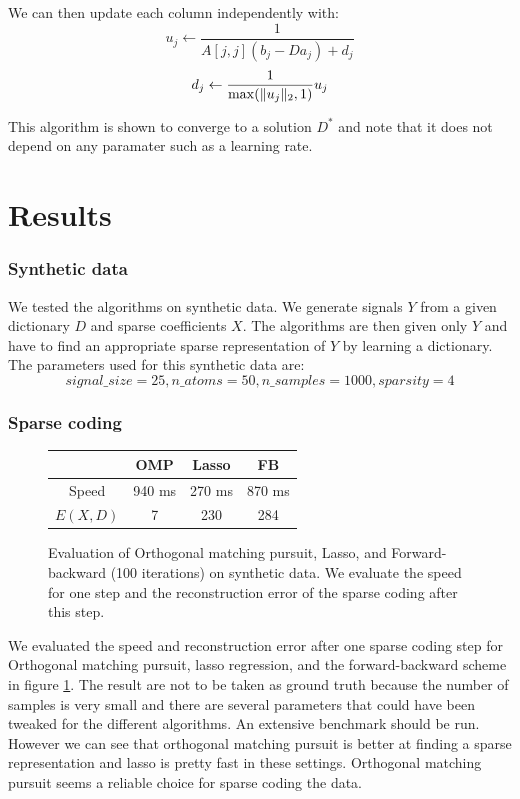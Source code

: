 \documentclass[a4paper,11pt]{article}
\DeclarePairedDelimiter\norm{\lVert}{\rVert} %
\begin{document}
We can then update each column independently with:
$$ u_j \leftarrow \frac{1}{A[j,j](b_j - D a_j) + d_j} $$
$$ d_j \leftarrow \frac{1}{\max(\norm{u_j}_2, 1)} u_j $$

This algorithm is shown to converge to a solution $D^*$ and note that it does not depend on any paramater such as a learning rate.

\section{Results}
\subsubsection*{Synthetic data}
We tested the algorithms on synthetic data.
We generate signals $Y$ from a given dictionary $D$ and sparse coefficients $X$. The algorithms are then given only $Y$ and have to find an appropriate sparse representation of $Y$ by learning a dictionary.
The parameters used for this synthetic data are:
$$signal\_size=25, n\_atoms=50, n\_samples=1000, sparsity=4$$

\subsubsection*{Sparse coding}

\begin{figure}[!htbp]
\begin{tabular}{|c|c|c|c|}
  \hline
  & OMP & Lasso & FB \\ \hline
  Speed & 940 ms & 270 ms & 870 ms \\ \hline
  $E(X,D)$ & 7 & 230 & 284 \\ \hline
\end{tabular}
  \caption{Evaluation of Orthogonal matching pursuit, Lasso, and Forward-backward (100 iterations) on synthetic data. We evaluate the speed for one step and the reconstruction error of the sparse coding after this step.}
  \label{sparse_coding_perfs}
\end{figure}
We evaluated the speed and reconstruction error after one sparse coding step for Orthogonal matching pursuit, lasso regression, and the forward-backward scheme in figure \ref{sparse_coding_perfs}.
The result are not to be taken as ground truth because the number of samples is very small and there are several parameters that could have been tweaked for the different algorithms. An extensive benchmark should be run.
However we can see that orthogonal matching pursuit is better at finding a sparse representation and lasso is pretty fast in these settings. Orthogonal matching pursuit seems a reliable choice for sparse coding the data.
\end{document}
